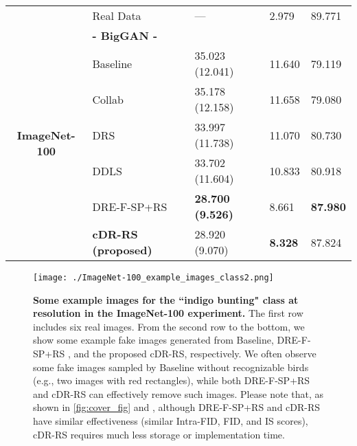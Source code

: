 \documentclass[final,12pt, 3p,times]{elsarticle}
\begin{document}
\begin{table}[htbp]
\begin{adjustbox}{width=0.5\textwidth}
\begin{tabular}{rllll}
			\midrule
			
			\multicolumn{1}{c}{} & Real Data & --- & 2.979 & 89.771 \\
			\cline{2-5}
			\multicolumn{1}{c}{\multirow{7}[0]{*}{\begin{sideways}\textbf{ImageNet-100}\end{sideways}}} & \textbf{- BigGAN -} &       &       &  \\
			\multicolumn{1}{c}{} & Baseline & 35.023 (12.041) & 11.640 & 79.119 \\
			\multicolumn{1}{c}{} & Collab \cite{liu2020collaborative} & 35.178 (12.158) & 11.658 & 79.080 \\
			\multicolumn{1}{c}{} & DRS \cite{azadi2018discriminator}  & 33.997 (11.738) & 11.070 & 80.730 \\
			\multicolumn{1}{c}{} & DDLS \cite{che2020your} & 33.702 (11.604) & 10.833 & 80.918 \\
			\multicolumn{1}{c}{} & DRE-F-SP+RS \cite{ding2020subsampling} & \textbf{28.700 (9.526)} & 8.661 & \textbf{87.980} \\
			\multicolumn{1}{c}{} & \textbf{cDR-RS (proposed)} & 28.920 (9.070) & \textbf{8.328} & 87.824 \\
			\bottomrule
		\end{tabular}\end{adjustbox}
	\label{tab:effectiveness_analysis_classification}\end{table}



\begin{figure}[t] \centering
	\texttt{[image: ./ImageNet-100\_example\_images\_class2.png]} 
	\caption{\textbf{Some example images for the ``indigo bunting" class at  resolution in the ImageNet-100 experiment.} The first row includes six real images. From the second row to the bottom, we show some example fake images generated from Baseline, DRE-F-SP+RS \cite{ding2020subsampling}, and the proposed cDR-RS, respectively. We often observe some fake images sampled by Baseline without recognizable birds (e.g., two images with red rectangles), while both DRE-F-SP+RS and cDR-RS can effectively remove such images. Please note that, as shown in \cref{fig:cover_fig} and , although DRE-F-SP+RS and cDR-RS have similar effectiveness (similar Intra-FID, FID, and IS scores), cDR-RS requires much less storage or implementation time.}
	\label{fig:ImageNet-100_example_images}
\end{figure}
\end{document}
